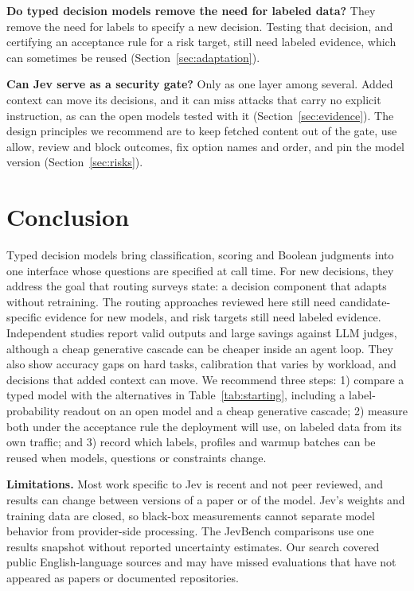 \noindent\textbf{Do typed decision models remove the need for labeled data?} They remove the need for labels to specify a new decision. Testing that decision, and certifying an acceptance rule for a risk target, still need labeled evidence, which can sometimes be reused (Section~\ref{sec:adaptation}).

\noindent\textbf{Can Jev serve as a security gate?} Only as one layer among several. Added context can move its decisions, and it can miss attacks that carry no explicit instruction, as can the open models tested with it (Section~\ref{sec:evidence}). The design principles we recommend are to keep fetched content out of the gate, use allow, review and block outcomes, fix option names and order, and pin the model version (Section~\ref{sec:risks}).

\section{Conclusion}
\label{sec:conclusion}

Typed decision models bring classification, scoring and Boolean judgments into one interface whose questions are specified at call time. For new decisions, they address the goal that routing surveys state: a decision component that adapts without retraining. The routing approaches reviewed here still need candidate-specific evidence for new models, and risk targets still need labeled evidence. Independent studies report valid outputs and large savings against LLM judges, although a cheap generative cascade can be cheaper inside an agent loop. They also show accuracy gaps on hard tasks, calibration that varies by workload, and decisions that added context can move. We recommend three steps: 1) compare a typed model with the alternatives in Table~\ref{tab:starting}, including a label-probability readout on an open model and a cheap generative cascade; 2) measure both under the acceptance rule the deployment will use, on labeled data from its own traffic; and 3) record which labels, profiles and warmup batches can be reused when models, questions or constraints change.

\noindent\textbf{Limitations.} Most work specific to Jev is recent and not peer reviewed, and results can change between versions of a paper or of the model. Jev's weights and training data are closed, so black-box measurements cannot separate model behavior from provider-side processing. The JevBench comparisons use one results snapshot without reported uncertainty estimates. Our search covered public English-language sources and may have missed evaluations that have not appeared as papers or documented repositories.
